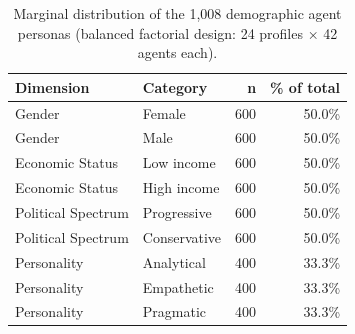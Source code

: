 \begin{table}
\caption{Marginal distribution of the 1,008 demographic agent personas (balanced factorial design: 24 profiles × 42 agents each).}
\label{tab:demographic_distribution}
\begin{tabular}{llrr}
\toprule
Dimension & Category & n & \% of total \\
\midrule
Gender & Female & 600 & 50.0\% \\
Gender & Male & 600 & 50.0\% \\
Economic Status & Low income & 600 & 50.0\% \\
Economic Status & High income & 600 & 50.0\% \\
Political Spectrum & Progressive & 600 & 50.0\% \\
Political Spectrum & Conservative & 600 & 50.0\% \\
Personality & Analytical & 400 & 33.3\% \\
Personality & Empathetic & 400 & 33.3\% \\
Personality & Pragmatic & 400 & 33.3\% \\
\bottomrule
\end{tabular}
\end{table}
